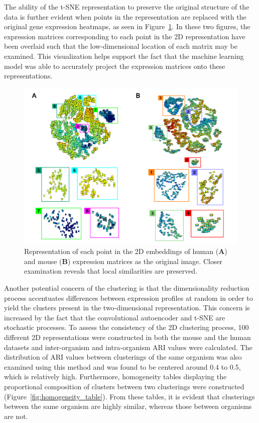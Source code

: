 \documentclass[12pt,oneside,onecolumn,a4paper]{article}
\begin{document}
The ability of the t-SNE representation to preserve the original structure of the data is further evident when points in the representation are replaced with the original gene expression heatmaps, as seen in Figure~\ref{fig:image_scatter}. In these two figures, the expression matrices corresponding to each point in the 2D representation have been overlaid such that the low-dimensional location of each matrix may be examined. This visualization helps support the fact that the machine learning model was able to accurately project the expression matrices onto these representations.

\begin{figure}[H]
\begin{center}
\includegraphics[width=\columnwidth]{figures/image_cluster}
\caption{Representation of each point in the 2D embeddings of human (\textbf{A}) and mouse (\textbf{B}) expression matrices as the original image. Closer examination reveals that local similarities are preserved. \label{fig:image_scatter}%
}
\end{center}
\end{figure}

Another potential concern of the clustering is that the dimensionality reduction process accentuates differences between expression profiles at random in order to yield the clusters present in the two-dimensional representation. This concern is increased by the fact that the convolutional autoencoder and t-SNE are stochastic processes. To assess the consistency of the 2D clustering process, 100 different 2D representations were constructed in both the mouse and the human datasets and inter-organism and intra-organism ARI values were calculated. The distribution of ARI values between clusterings of the same organism was also examined using this method and was found to be centered around 0.4 to 0.5, which is relatively high. Furthermore, homogeneity tables displaying the proportional composition of clusters between two clusterings were constructed (Figure~\ref{fig:homogeneity_table}). From these tables, it is evident that clusterings between the same organism are highly similar, whereas those between organisms are not.
\end{document}
